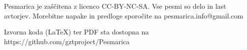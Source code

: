 \documentclass[a4paper,12pt]{article}
\begin{document}
Pesmarica je zaščitena z licenco CC-BY-NC-SA. Vse pesmi so delo in last avtorjev. Morebitne napake in predloge sporočite na pesmarica.info@gmail.com 

Izvorna koda (LaTeX) ter PDF sta dostopna na https://github.com/gztproject/Pesmarica
\end{document}
